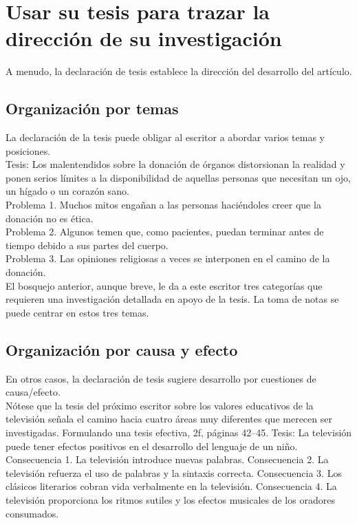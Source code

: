 \section{Usar su tesis para trazar la dirección de su investigación}
A menudo, la declaración de tesis establece la dirección del desarrollo del artículo.

\subsection{Organización por temas}
La declaración de la tesis puede obligar al escritor a abordar varios temas y posiciones. \\
Tesis: Los malentendidos sobre la donación de órganos distorsionan la realidad y ponen serios límites a la disponibilidad de aquellas personas que necesitan un ojo, un hígado o un corazón sano. \\
Problema 1. Muchos mitos engañan a las personas haciéndoles creer que la donación no es ética. \\
Problema 2. Algunos temen que, como pacientes, puedan terminar antes de tiempo debido a sus partes del cuerpo. \\
Problema 3. Las opiniones religiosas a veces se interponen en el camino de la donación. \\

El bosquejo anterior, aunque breve, le da a este escritor tres categorías que requieren una investigación detallada en apoyo de la tesis. La toma de notas se puede centrar en estos tres temas.


\subsection{Organización por causa y efecto}
En otros casos, la declaración de tesis sugiere desarrollo por cuestiones de causa/efecto. \\

Nótese que la tesis del próximo escritor sobre los valores educativos de la televisión señala el camino hacia cuatro áreas muy diferentes que merecen ser investigadas. Formulando una tesis efectiva, 2f, páginas 42–45. Tesis: La televisión puede tener efectos positivos en el desarrollo del lenguaje de un niño. Consecuencia 1. La televisión introduce nuevas palabras. Consecuencia 2. La televisión refuerza el uso de palabras y la sintaxis correcta. Consecuencia 3. Los clásicos literarios cobran vida verbalmente en la televisión. Consecuencia 4. La televisión proporciona los ritmos sutiles y los efectos musicales de los oradores consumados.

